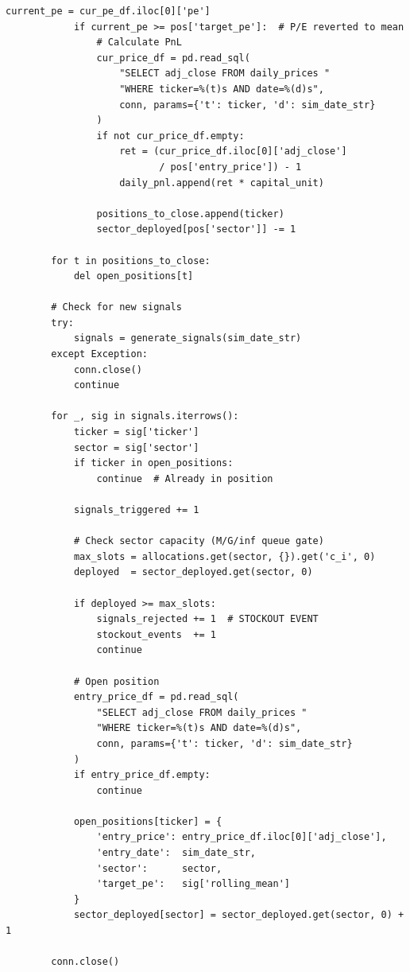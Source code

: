 \documentclass[11pt, oneside]{book}
\begin{document}
\begin{lstlisting}[style=pythonstyle, caption={Complete Walk-Forward Optimization Loop}]
            current_pe = cur_pe_df.iloc[0]['pe']
            if current_pe >= pos['target_pe']:  # P/E reverted to mean
                # Calculate PnL
                cur_price_df = pd.read_sql(
                    "SELECT adj_close FROM daily_prices "
                    "WHERE ticker=%(t)s AND date=%(d)s",
                    conn, params={'t': ticker, 'd': sim_date_str}
                )
                if not cur_price_df.empty:
                    ret = (cur_price_df.iloc[0]['adj_close']
                           / pos['entry_price']) - 1
                    daily_pnl.append(ret * capital_unit)

                positions_to_close.append(ticker)
                sector_deployed[pos['sector']] -= 1

        for t in positions_to_close:
            del open_positions[t]

        # Check for new signals
        try:
            signals = generate_signals(sim_date_str)
        except Exception:
            conn.close()
            continue

        for _, sig in signals.iterrows():
            ticker = sig['ticker']
            sector = sig['sector']
            if ticker in open_positions:
                continue  # Already in position

            signals_triggered += 1

            # Check sector capacity (M/G/inf queue gate)
            max_slots = allocations.get(sector, {}).get('c_i', 0)
            deployed  = sector_deployed.get(sector, 0)

            if deployed >= max_slots:
                signals_rejected += 1  # STOCKOUT EVENT
                stockout_events  += 1
                continue

            # Open position
            entry_price_df = pd.read_sql(
                "SELECT adj_close FROM daily_prices "
                "WHERE ticker=%(t)s AND date=%(d)s",
                conn, params={'t': ticker, 'd': sim_date_str}
            )
            if entry_price_df.empty:
                continue

            open_positions[ticker] = {
                'entry_price': entry_price_df.iloc[0]['adj_close'],
                'entry_date':  sim_date_str,
                'sector':      sector,
                'target_pe':   sig['rolling_mean']
            }
            sector_deployed[sector] = sector_deployed.get(sector, 0) + 1

        conn.close()


\end{lstlisting}
\end{document}
